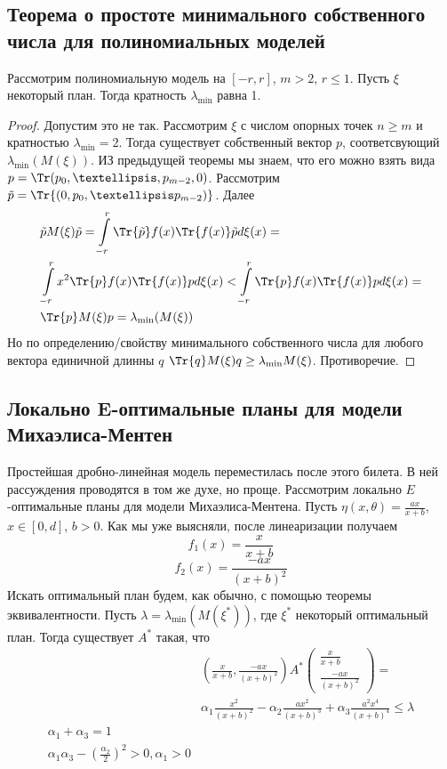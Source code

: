  \subsection{Теорема о простоте минимального собственного числа для полиномиальных моделей}
 \begin{thm}
Рассмотрим полиномиальную модель на  $[-r,r]$, $m > 2$, $r \leq 1$. Пусть $\xi$ некоторый план. Тогда кратность $\lambda_{\min}$ равна 1.
 \end{thm}
\begin{proof}
Допустим это не так. Рассмотрим $\xi$ с числом опорных точек $n \geq m$ и кратностью $\lambda_{\min} = 2$. Тогда 
существует собственный вектор $p$, соответсвующий $\lambda_{\min}(M(\xi))$. ИЗ предыдущей теоремы мы знаем, что его можно взять вида $p = \Tr(p_0, …, p_{m-2}, 0)$. Рассмотрим $\tilde{p} = \Tr{(0, p_0,…p_{m-2})}$. Далее
\begin{equation}
\begin{split}
&\tilde{p}M(\xi)\tilde{p} = \int\limits_{-r}^r \Tr{\tilde{p}} f(x) \Tr{f(x)} \tilde{p}d\xi(x) = \\
&\int\limits_{-r}^r x^2 \Tr{p} f(x)\Tr{f(x)} p d\xi(x) < \int  \limits_{-r}^r  \Tr{p} f(x)\Tr{f(x)} p d\xi(x)= \\
&\Tr{p}M(\xi)p = \lambda_{\min}(M(\xi))
 \end{split}
 \end{equation}
 Но по определению/свойству минимального собственного числа для любого вектора единичной длинны $q$
 $\Tr{q} M(\xi)q \geq \lambda_{\min}M(\xi)$. Противоречие.
\end{proof}


\subsection{Локально E-оптимальные планы для модели Михаэлиса-Ментен}
{\color{blue} Простейшая дробно-линейная модель переместилась после этого билета. В ней рассуждения проводятся в том же духе, но проще. }
Рассмотрим локально $E$-оптимальные планы для модели Михаэлиса-Ментена. Пусть 
$\eta(x, \theta) = \frac{ax}{x+b}$, $x\in[0,d]$, $b > 0$. Как мы уже выясняли, после линеаризации получаем
$$f_1(x) = \frac{x}{x+b}$$
$$f_2(x) = \frac{-ax}{(x+b)^2}$$
Искать оптимальный план будем, как обычно, с помощью теоремы эквивалентности. Пусть $\lambda = \lambda_{\min}(M(\xi^{*}))$, где $\xi^{*}$ некоторый оптимальный план. Тогда существует $A^{*}$ такая, что
\begin{equation}
\begin{split}
&(\frac{x}{x+b}, \frac{-ax}{(x+b)^2}) A^{*}\begin{pmatrix} \frac{x}{x+b}\\ \frac{-ax}{(x+b)^2}\end{pmatrix} = \\
& \alpha_1 \frac{x^2}{(x+b)^2} - \alpha_2 \frac{ax^2}{(x+b)^3} + \alpha_3\frac{a^2 x^4}{(x+b)^4} \leq \lambda \\
\alpha_1 + \alpha_3 = 1\\
\alpha_1 \alpha_3 - (\frac{\alpha_2}{2})^2 > 0, \alpha_1 > 0
\end{split}
\end{equation}

